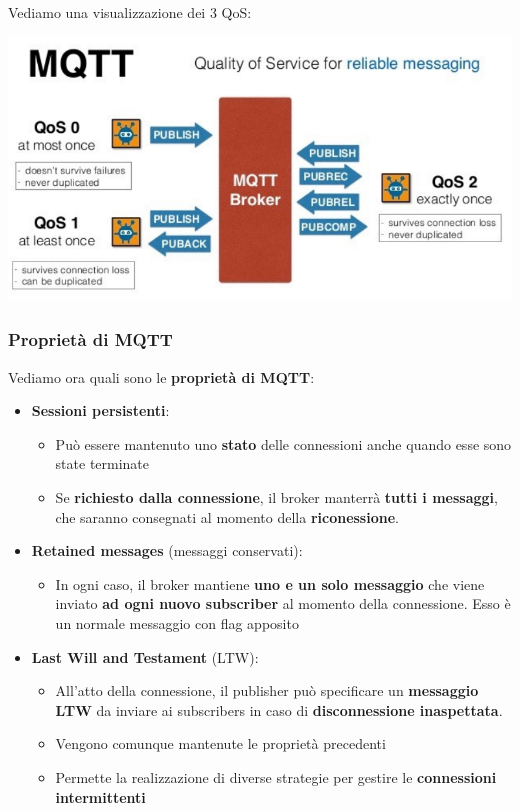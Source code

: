 \documentclass[12pt]{article}
\begin{document}
Vediamo una visualizzazione dei 3 QoS:
\begin{center}
    \includegraphics[width = 1\textwidth]{Images/145.PNG}
\end{center}
\subsubsection{Proprietà di MQTT}
Vediamo ora quali sono le \textbf{proprietà di MQTT}:
\begin{itemize}
    \item \textbf{Sessioni persistenti}:
          \begin{itemize}
              \item Può essere mantenuto uno \textbf{stato} delle connessioni anche quando esse sono state terminate
              \item Se \textbf{richiesto dalla connessione}, il broker manterrà \textbf{tutti i messaggi}, che saranno consegnati al momento della \textbf{riconessione}.
          \end{itemize}
    \item \textbf{Retained messages} (messaggi conservati):
          \begin{itemize}
              \item In ogni caso, il broker mantiene \textbf{uno e un solo messaggio} che viene inviato \textbf{ad ogni nuovo subscriber} al momento della connessione. Esso è un normale messaggio con flag apposito
          \end{itemize}
    \item \textbf{Last Will and Testament} (LTW):
          \begin{itemize}
              \item All'atto della connessione, il publisher può specificare un \textbf{messaggio LTW} da inviare ai subscribers in caso di \textbf{disconnessione inaspettata}.
              \item Vengono comunque mantenute le proprietà precedenti
              \item Permette la realizzazione di diverse strategie per gestire le \textbf{connessioni intermittenti}
          \end{itemize}
\end{itemize}
\end{document}
